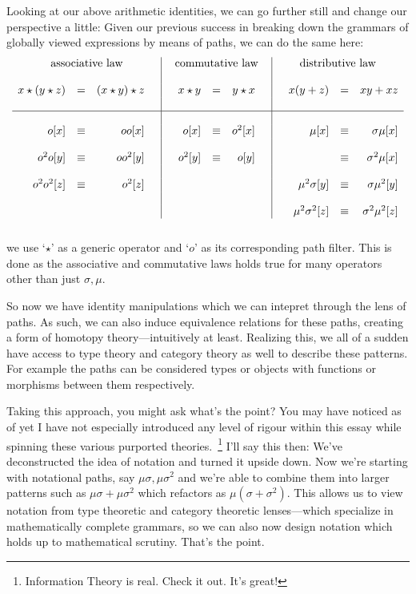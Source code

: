 \documentclass[twoside]{article}
\begin{document}
Looking at our above arithmetic identities, we can go further still and change our perspective a little: Given our
previous success in breaking down the grammars of globally viewed expressions by means of paths, we can do the same here:
$$ \begin{array}{rcr|rcr|rcr}
\multicolumn{3}{c|}{\mbox{associative law}}& \multicolumn{3}{c|}{\mbox{commutative law}}& \multicolumn{3}{c}{\mbox{distributive law}}	\\
	 &	&	 \quad&\quad		&	&		\quad&\quad			&	&			\\
x\star(y\star z)&=&(x\star y)\star z\quad&\quad x\star y&=&y\star x	\quad&\quad x(y+z)		& =	& xy+xz			\\
	 &	&	 \quad&\quad		&	&		\quad&\quad			&	&			\\
\hline
	 &	&	 \quad&\quad		&	&		\quad&\quad			&	&			\\
o[x]	 &\equiv& oo[x]	 \quad&\quad o[x]	&\equiv & o^2[x]	\quad&\quad \mu[x]		& \equiv& \sigma\mu[x]		\\
	 &	&	 \quad&\quad		&	&		\quad&\quad			&	&			\\
o^2o[y]	 &\equiv& oo^2[y]\quad&\quad o^2[y]	&\equiv & o[y]		\quad&\quad			& \equiv& \sigma^2\mu[x]	\\
	 &	&	 \quad&\quad		&	&		\quad&\quad			&	&			\\
o^2o^2[z]&\equiv& o^2[z] \quad&\quad		&	&		\quad&\quad \mu^2\sigma[y]	& \equiv& \sigma\mu^2[y]	\\
	 &	&	 \quad&\quad		&	&		\quad&\quad			&	&			\\
	 &	&	 \quad&\quad		&	&		\quad&\quad \mu^2\sigma^2[z]	& \equiv& \sigma^2\mu^2[z]	\\
																	\\
\end{array} $$
we use `$ \star $' as a generic operator and `$ o $' as its corresponding path filter. This is done
as the associative and commutative laws holds true for many operators other than just $ \sigma, \mu $.

So now we have identity manipulations which we can intepret through the lens of paths. As such, we can also induce
equivalence relations for these paths, creating a form of homotopy theory---intuitively at least. Realizing this,
we all of a sudden have access to type theory and category theory as well to describe these patterns. For example
the paths can be considered types or objects with functions or morphisms between them respectively.

Taking this approach, you might ask what's the point? You may have noticed as of yet I have not especially introduced any level
of rigour within this essay while spinning these various purported theories.~\footnote{Information Theory is real. Check it
out. It's great!} I'll say this then: We've deconstructed the idea of notation and turned it upside down. Now we're starting
with notational paths, say $ \mu\sigma, \mu\sigma^2 $ and we're able to combine them into larger patterns such as
$ \mu\sigma+\mu\sigma^2 $ which refactors as $ \mu(\sigma+\sigma^2) $. This allows us to view notation from type theoretic
and category theoretic lenses---which specialize in mathematically complete grammars, so we can also now design notation which
holds up to mathematical scrutiny. That's the point.
\end{document}
